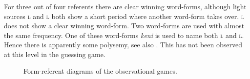 For three out of four referents there are clear winning word-forms, although light sources \textsc{l} and \textsc{l} both show a short period where another word-form takes over. \textsc{l} does not show a clear winning word-form. Two word-forms are used with almost the same frequency. One of these word-forms {\it keni} is used to name both \textsc{l} and \textsc{l}. Hence there is apparently some polysemy, see also . This has not been observed at this level in the guessing game.

\begin{figure}[t]
\centering
{}
\caption{Form-referent diagrams of the observational games.}
\label{f:opt:froli}
\end{figure}


